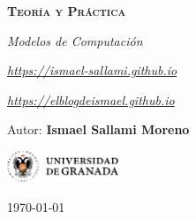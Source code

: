 \documentclass[12pt]{report} %
\begin{document}
\begin{titlepage}
    \begin{center}
        \vspace*{2cm}
        
        {\Huge \bfseries\scshape Teoría y Práctica \par}
        \vspace{0.5cm}
        {\Large \itshape Modelos de Computación \par}
        \vspace{0.5cm}
        {\small \itshape \href{https://ismael-sallami.github.io}{https://ismael-sallami.github.io} \par}
        {\small \itshape \href{https://elblogdeismael.github.io}{https://elblogdeismael.github.io} \par}


        \vfill
        
        {\LARGE Autor: \textbf{Ismael Sallami Moreno} \par}
        \vspace{0.3cm}
        
        \vspace{1cm}
        \includegraphics[width=0.25\textwidth]{../../../extraFiles/img/ugr.png} %
        \vspace{1cm}
        
        {\large \today}
    \end{center}
    
    \restoregeometry
\end{titlepage}


\thispagestyle{empty} %
\clearpage

\tableofcontents
\listoffigures
\clearpage

\listoftables
\clearpage
\thispagestyle{empty} %
\clearpage

\renewcommand{\lstlistlistingname}{Índice de Código}
\lstlistoflistings
\clearpage

\renewcommand{\listtheoremname}{Índice de Ecuaciones}
\listoftheorems[ignoreall,show={equation}]
\clearpage
\end{document}
